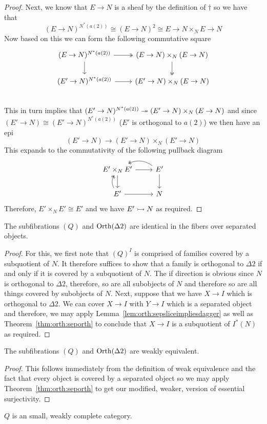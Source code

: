 \begin{proof}
  Next, we know that $E \to N$ is a sheaf by the definition of
  $\dagger$ so we have that
  \[
    (E \to N)^{N^*(a(2))} \cong (E \to N)^2 \cong E \to N \times_N E \to N
  \]
  Now based on this we can form the following commutative square
  \[
    \begin{tikzcd}
      (E \to N)^{N^*(a(2))} \ar[r, twoheadrightarrow] \ar[d] & (E \to N) \times_N (E \to N) \ar[d, twoheadrightarrow]\\
      (E' \to N)^{N^*(a(2))} \ar[r] & (E' \to N) \times_N (E \to N)\\
    \end{tikzcd}
  \]
  This in turn implies that
  $(E' \to N)^{N^*(a(2))} \twoheadrightarrow (E' \to N) \times_N (E \to N)$ and
  since $(E' \to N) \cong (E' \to N)^{N^*(a(2))}$ ($E'$ is orthogonal
  to $a(2)$) we then have an epi
  \[
    (E' \to N) \to (E' \to N) \times_N (E' \to N)
  \]
  This expands to the commutativity of the following pullback diagram
  \[
    \begin{tikzcd}
      E' \times_N E' \ar[d] \ar[r] & E' \ar[d] \ar[l, bend right, twoheadrightarrow] \\
      \ar[u, bend left, twoheadrightarrow] E' \ar[r] & N
    \end{tikzcd}
  \]
  Therefore, $E' \times_N E' \cong E'$ and we have $E' \rightarrowtail N$ as
  required.
\end{proof}
\begin{thm}\label{thm:orth:seporth}
  The subfibrations $(Q)$ and $\operatorname{Orth}(\Delta 2)$ are identical in the
  fibers over separated objects.
\end{thm}
\begin{proof}
  For this, we first note that $(Q)^I$ is comprised of families
  covered by a subquotient of $N$. It therefore suffices to show that
  a family is orthogonal to $\Delta 2$ if and only if it is covered by
  a subquotient of $N$. The if direction is obvious since $N$ is
  orthogonal to $\Delta 2$, therefore, so are all subobjects of $N$
  and therefore so are all things covered by subobjects of $N$. Next,
  suppose that we have $X \to I$ which is orthogonal to $\Delta 2$. We
  can cover $X \to I$ with $Y \to I$ which is a separated object and
  therefore, we may apply Lemma~\ref{lem:orth:sepsliceimpliesdagger}
  as well as Theorem~\ref{thm:orth:seporth} to conclude that $X \to I$
  is a subquotient of $I^*(N)$ as required.
\end{proof}
\begin{cor}
  The subfibrations $(Q)$ and $\operatorname{Orth}(\Delta 2)$ are weakly
  equivalent.
\end{cor}
\begin{proof}
  This follows immediately from the definition of weak equivalence and
  the fact that every object is covered by a separated object so we
  may apply Theorem~\ref{thm:orth:seporth} to get our modified,
  weaker, version of essential surjectivity.
\end{proof}
\begin{cor}
  $Q$ is an small, weakly complete category.
\end{cor}

